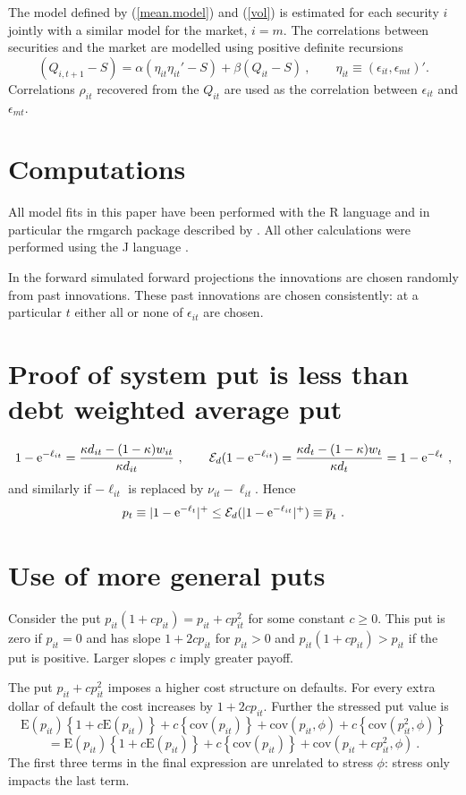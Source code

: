 \documentclass[authoryear]{elsarticle}
\newcommand{\E}{\mathrm{E}}
\newcommand{\e}{\mathrm{e}}
\newcommand{\cov}{\mathrm{cov}}
\newcommand{\eps}{\epsilon}
\newcommand{\Ex}{{\cal E}}
\newcommand{\eref}[1]{(\ref{#1})}
\newcommand{\cq}{\ , \qquad}
\begin{document}
The model defined by \eref{mean.model} and \eref{vol} is estimated  for each security $i$ jointly with  a similar model for  the market,  $i=m$.   The correlations between securities and the market are modelled using  positive definite recursions   \citep{engle2002dynamic}
$$
(Q_{i,t+1}-S) = \alpha (\eta_{it}\eta_{it}'-S) + \beta (Q_{it}-S)\cq \eta_{it}\equiv(\eps_{it},\eps_{mt})' .
$$
Correlations $\rho_{it}$ recovered from the $Q_{it}$ are used as the correlation between $\eps_{it}$ and $\eps_{mt}$.

\section{Computations}

All model fits in this paper have been performed with the R language \citep{R-Development-Core-Team:2008aa} and in particular the rmgarch package described by \cite{ghalanos2012rmgarch}.  All other calculations were performed using the J language \citep{iverson2003j}.

In the forward simulated forward projections the  innovations are chosen randomly from past innovations.   These past innovations are chosen consistently:  at a particular $t$ either all or none of $\eps_{it}$ are chosen.

\section{Proof of system put is less   than debt weighted average put}\label{proof}

$$
1-\e^{-\ell_{it}} = \frac{ \kappa d_{it} - (1-\kappa)w_{it}}{\kappa d_{it}}\cq \Ex_d (1-\e^{-\ell_{it}}) = \frac{\kappa d_t - (1-\kappa) w_t}{\kappa d_t} = 1-\e^{-\ell_t} \ ,
$$
and similarly if $-\ell_{it}$ is replaced by $\nu_{it}-\ell_{it}$.   Hence
$$
p_t\equiv |1-\e^{-\ell_t}|^+ \le \Ex_d (|1-\e^{-\ell_{it}}|^+)\equiv \overline p_t\ .
$$

\section{Use of more general puts}

Consider the put $p_{it}(1+cp_{it})=p_{it}+cp_{it}^2 $ for some constant $c\ge 0$.   This put is zero if $p_{it}=0$ and has slope $1+2cp_{it}$ for $p_{it}>0$ and $p_{it}(1+cp_{it})>p_{it}$ if the put is positive.  Larger slopes $c$ imply greater payoff.

The put $p_{it}+cp_{it}^2$ imposes a higher cost structure on defaults.    For every extra dollar of default the cost increases by $1+2cp_{it}$.   Further the stressed put value is
$$
\E(p_{it})\left\{1+c\E(p_{it})\right\} +c\left\{\cov(p_{it})\right\}+ \cov(p_{it},\phi) + c\left\{\cov(p^2_{it},\phi)\right\}
$$
$$
=\E(p_{it})\left\{1+c\E(p_{it})\right\} +c\left\{\cov(p_{it})\right\}+ \cov(p_{it}+cp^2_{it},\phi)\ .
$$
The first three terms in the final expression are unrelated to stress $\phi$: stress only impacts the last term.
\end{document}
